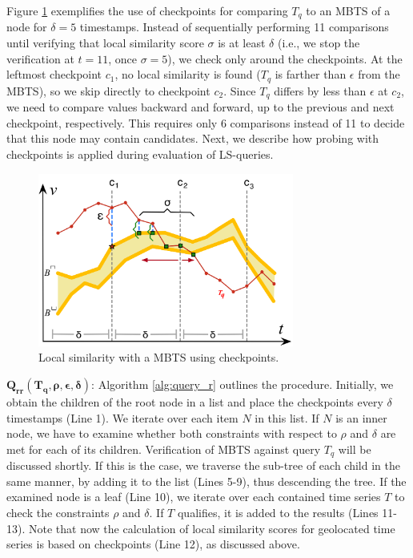 Figure \ref{fig:sim_mbts_checkpoints} exemplifies the use of checkpoints for comparing $T_q$ to an MBTS of a node for $\delta=5$ timestamps. Instead of sequentially performing 11 comparisons until verifying that local similarity score $\sigma$ is at least $\delta$ (i.e., we stop the verification at $t=11$, once $\sigma=5$), we check only around the checkpoints. At the leftmost checkpoint $c_1$, no local similarity is found ($T_q$ is farther than $\epsilon$ from the MBTS), so we skip directly to checkpoint $c_2$. Since $T_q$ differs by less than $\epsilon$ at $c_2$, we need to compare values backward and forward, up to the previous and next checkpoint, respectively. This requires only 6 comparisons instead of 11 to decide that this node may contain candidates. Next, we describe how probing with checkpoints is applied during evaluation of LS-queries.

\begin{figure}[tb]
    \centering
    \includegraphics[width=0.75\textwidth]{Figures/sim_mbts_checkpoints.png}
    \caption{Local similarity with a MBTS using checkpoints.}
    \label{fig:sim_mbts_checkpoints}
\end{figure}

\noindent $\mathbold{Q_{rr}(T_q, \rho, \epsilon, \delta)}$: Algorithm \ref{alg:query_r} outlines the procedure. Initially, we obtain the children of the root node in a list and place the checkpoints every $\delta$ timestamps (Line 1). We iterate over each item $N$ in this list. If $N$ is an inner node, we have to examine whether both constraints with respect to $\rho$ and $\delta$ are met for each of its children. Verification of MBTS against query $T_q$ will be discussed shortly. If this is the case, we traverse the sub-tree of each child in the same manner, by adding it to the list (Lines 5-9), thus descending the tree. If the examined node is a leaf (Line 10), we iterate over each contained time series $T$ to check the constraints $\rho$ and $\delta$. If $T$ qualifies, it is added to the results (Lines 11-13). Note that now the calculation of local similarity scores for geolocated time series is based on checkpoints (Line 12), as discussed above.

